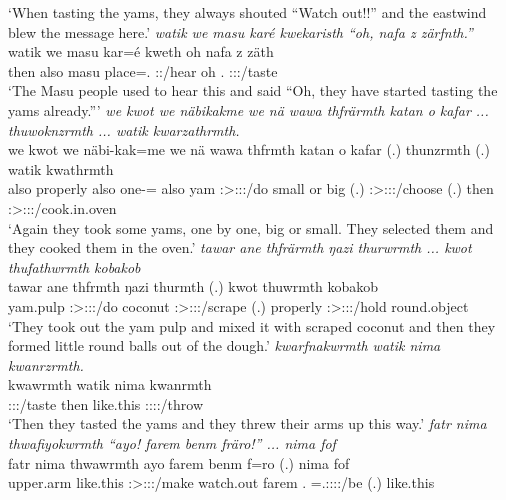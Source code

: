 \begin{exe}
	\trans `When tasting the yams, they always shouted ``Watch out!!'' and the eastwind blew the message here.'
	\emph{watik we masu karé kwekaristh ``oh, nafa z zärfnth.''}\\
	\gll watik we masu kar=é kweth oh nafa z zäth\\ 
	then also masu place=\Erg.\Nsg{} \Stpl:\Sbj:\Iter/hear oh \Tnsg.\Erg{} \Iam{} \Stpl:\Sbj:\Rpst:\Pfv/taste\\
	\trans `The Masu people used to hear this and said ``Oh, they have started tasting the yams already.'''
	\emph{we kwot we näbikakme we nä wawa thfrärmth katan o kafar ... thuwoknzrmth ... watik kwarzathrmth.}\\
	\gll we kwot we näbi-kak=me we nä wawa thfrmth katan o kafar (.) thunzrmth (.) watik kwathrmth\\ 
	also properly also one-\Distr=\Ins{} also \Indf{} yam \Stpl:\Sbj>\Stpl:\Obj:\Pst:\Dur/do small or big (.) \Stpl:\Sbj>\Stpl:\Obj:\Pst:\Dur/choose (.) then \Stpl:\Sbj>\Stpl:\Obj:\Pst:\Dur/cook.in.oven\\
	\trans `Again they took some yams, one by one, big or small. They selected them and they cooked them in the oven.'
	\emph{tawar ane thfrärmth ŋazi thurwrmth ... kwot thufathwrmth kobakob}\\
	\gll tawar ane thfrmth ŋazi thurmth (.) kwot thuwrmth kobakob\\ 
	yam.pulp \Dem{} \Stpl:\Sbj>\Stpl:\Obj:\Pst:\Dur/do coconut \Stpl:\Sbj>\Stpl:\Obj:\Pst:\Dur/scrape (.) properly \Stpl:\Sbj>\Stpl:\Obj:\Pst:\Dur/hold round.object\\
	\trans `They took out the yam pulp and mixed it with scraped coconut and then they formed little round balls out of the dough.'
	\emph{kwarfnakwrmth watik nima kwanrzrmth.}\\
	\gll kwawrmth watik nima kwanrmth\\ 
	\Sg:\Sbj:\Pst:\Dur/taste then like.this \Sg:\Sbj:\Pst:\Dur:\Venit/throw\\
	\trans `Then they tasted the yams and they threw their arms up this way.'
	\emph{fatr nima thwafiyokwrmth ``ayo! farem benm fräro!'' ... nima fof}\\
	\gll fatr nima thwawrmth ayo farem benm f=ro (.) nima fof\\ 
	upper.arm like.this \Stpl:\Sbj>\Stpl:\Obj:\Pst:\Dur/make watch.out farem \Snsg.\Dat{} \Dist=\Tsg.\F:\Sbj:\Nonpast:\Ipfv:\Andat/be (.) like.this \Emph{}\\

\end{exe}
